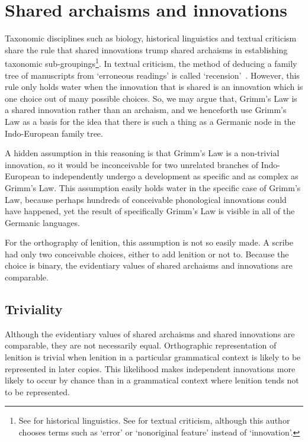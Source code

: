 \begin{mwl}
\end{mwl}

\section{Shared archaisms and innovations}
\label{sec:shar-innov-arch}

Taxonomic disciplines such as biology, historical linguistics and textual criticism  share the rule that shared innovations trump shared archaisms in establishing taxonomic sub-groupings\footnote{See \eg \textcite[169]{MT_Trask15} for historical linguistics. See \eg \textcite[103--104, 107]{Tar_Classical95} for textual criticism, although this author chooses terms such as `error' or `nonoriginal feature' instead of `innovation'.}. In textual criticism, the method of deducing a family tree of manuscripts from `erroneous readings' is called `recension'~\autocite[232]{Sar_Manuscript13}. However, this rule only holds water when the innovation that is shared is an innovation which is one choice out of many possible choices. So,  we may argue that, \eg Grimm's Law is a shared innovation rather than an archaism, and we henceforth use Grimm's Law as a basis for the idea that there is such a thing as a Germanic node in the Indo-European family tree.

A hidden assumption  in this reasoning is that Grimm's Law is a non-trivial innovation, so it would be inconceivable for two unrelated branches of Indo-European to independently undergo a development as specific and as complex as Grimm's Law.  This assumption easily holds water in the specific case of Grimm's Law, because perhaps hundreds of conceivable phonological innovations  could have happened, yet the result of specifically Grimm's Law is visible in all of the Germanic languages.

For the orthography of lenition, this assumption is not so easily made. A scribe had only  two conceivable choices, either to add lenition or not to. Because the choice is binary, the evidentiary values of shared archaisms and innovations are comparable.

\subsection{Triviality}
\label{sec:more-fund-disc}
Although the evidentiary values of shared archaisms and shared innovations are comparable, they are not necessarily equal. Orthographic representation of lenition is trivial when lenition in a particular grammatical context is likely to be represented in later copies. This likelihood makes independent innovations more likely to occur by chance than in a grammatical context where lenition tends not to be represented.

